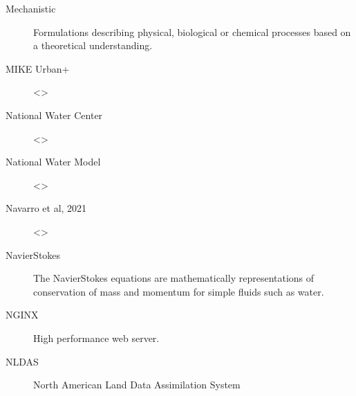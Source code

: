 \documentclass[letterpaper,10pt,english]{sphinxmanual}
\begin{document}
\begin{description}
\item[{Mechanistic\label{\detokenize{glossary:term-Mechanistic}}}] \leavevmode
\sphinxAtStartPar
Formulations describing physical, biological or chemical processes based on a theoretical understanding.

\item[{MIKE Urban+\label{\detokenize{glossary:term-MIKE-Urban}}}] \leavevmode
\sphinxAtStartPar
\textless{}\textgreater{}

\item[{National Water Center\label{\detokenize{glossary:term-National-Water-Center}}}] \leavevmode
\sphinxAtStartPar
\textless{}\textgreater{}

\item[{National Water Model\label{\detokenize{glossary:term-National-Water-Model}}}] \leavevmode
\sphinxAtStartPar
\textless{}\textgreater{}

\item[{Navarro et al, 2021\label{\detokenize{glossary:term-Navarro-et-al-2021}}}] \leavevmode
\sphinxAtStartPar
\textless{}\textgreater{}

\item[{Navier\sphinxhyphen{}Stokes\label{\detokenize{glossary:term-Navier-Stokes}}}] \leavevmode
\sphinxAtStartPar
The Navier\textendash{}Stokes equations are mathematically representations of conservation of mass and momentum for simple fluids such as water.

\item[{NGINX\label{\detokenize{glossary:term-NGINX}}}] \leavevmode
\sphinxAtStartPar
High performance web server.

\item[{NLDAS\label{\detokenize{glossary:term-NLDAS}}}] \leavevmode
\sphinxAtStartPar
North American Land Data Assimilation System


\end{description}
\end{document}
